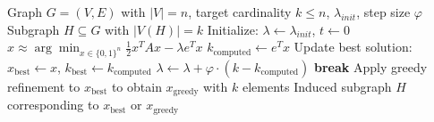 \documentclass{article}
\begin{document}
\begin{algorithm}[H]
    \caption{Lagrangian Relaxation Iterative Algorithm for  ~\eqref{SkS_QUBO_Lagrangian_1} relaxation}
    \label{alg: LRIA_algorithm}
    \begin{algorithmic}[1]
        \Require Graph $G = (V, E)$ with $|V| = n$, target cardinality $k \le n$, $\lambda_{init}$, step size $\varphi$
        \Ensure Subgraph $H \subseteq G$ with $|V(H)| = k$
        \State Initialize: $\lambda \gets \lambda_{init}$, $t \gets 0$
        \Repeat
            \State $x \approx \arg\min_{x \in \{0,1\}^n} \frac{1}{2} x^T A x - \lambda e^T x$
            \State $k_{\text{computed}} \gets e^T x$
                \State Update best solution: $x_{\text{best}} \gets x$, $k_{\text{best}} \gets k_{\text{computed}}$
            \EndIf
                \State $\lambda \gets \lambda + \varphi \cdot (k - k_{\text{computed}})$
            \Else
                \State \textbf{break}
            \EndIf
            \State Apply greedy refinement to $x_{\text{best}}$ to obtain $x_{\text{greedy}}$ with $k$ elements
        \EndIf
        \State \Return Induced subgraph $H$ corresponding to $x_{\text{best}}$ or $x_{\text{greedy}}$
    \end{algorithmic}
\end{algorithm}
\end{document}
